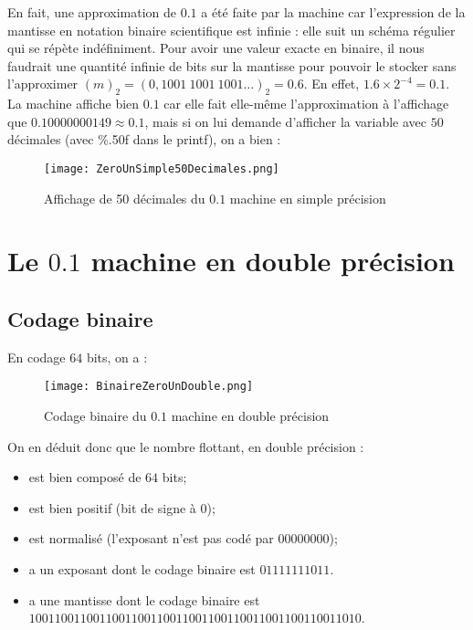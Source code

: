 \documentclass[a4paper, titlepage]{livret} %
\begin{document}
				En fait, une approximation de $0.1$ a été faite par la machine car l'expression de la mantisse en notation binaire scientifique est infinie : elle suit un schéma régulier qui se répète indéfiniment.
				Pour avoir une valeur exacte en binaire, il nous faudrait une quantité infinie de bits sur la mantisse pour pouvoir le stocker sans l'approximer $(m)_{2} = (0,1001 \ 1001 \ 1001…)_{2} = 0.6$.
				En effet, $1.6 \times 2^{-4} = 0.1$.
				La machine affiche bien $0.1$ car elle fait elle-même l'approximation à l'affichage que $0.10000000149 \approx 0.1$, mais si on lui demande d'afficher la variable avec $50$ décimales (avec \%.50f dans le printf), on a bien :
				\begin{figure}[!h]
					\centering
  						\texttt{[image: ZeroUnSimple50Decimales.png]}
  						\caption{Affichage de 50 décimales du $0.1$ machine en simple précision}
				\end{figure}
				\newpage

		\section{Le $0.1$ machine en double précision}
			\subsection{Codage binaire}
				En codage $64$ bits, on a :
				\begin{figure}[!h]
					\centering
  						\texttt{[image: BinaireZeroUnDouble.png]}
  						\caption{Codage binaire du $0.1$ machine en double précision}
				\end{figure}

				On en déduit donc que le nombre flottant, en double précision :
				\begin{itemize}
					\item est bien composé de $64$ bits;
					\item est bien positif (bit de signe à 0);
					\item est normalisé (l'exposant n'est pas codé par $00000000$);
					\item a un exposant dont le codage binaire est $01111111011$.
					\item a une mantisse dont le codage binaire est $10011001 10011001 10011001 10011001 10011001 10011001 1010$.
				\end{itemize}
\end{document}

